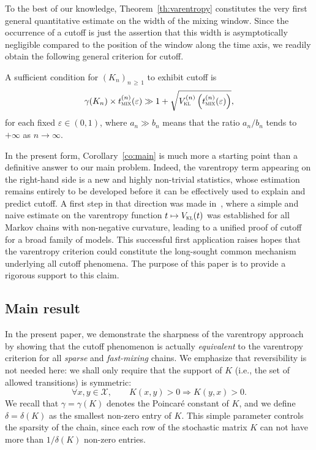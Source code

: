 \documentclass[10pt]{amsart}
\theoremstyle{definition}\newtheorem{defi}[theo]{Definition}\newtheorem{rema}[theo]{Remark}\newtheorem{exam}[theo]{Example}\newtheorem{exem}[theo]{Example}\newtheorem{nota}[theo]{Notation}
\newcommand{\cX}{\mathcal{X}}
\newcommand{\vkl}{V_{\textsc{kl}}}
\newcommand{\tmix}{t_{\textsc{mix}}}
\let\oldforall\forall
\renewcommand*{\forall}{\mathrel{\oldforall}}
\begin{document}
To the best of our knowledge, Theorem~\ref{th:varentropy} constitutes the very first general quantitative estimate on the width of the mixing window. Since the occurrence of a cutoff is just the assertion that this width is asymptotically negligible compared to the position of the window along the time axis, we readily obtain the following general criterion for cutoff.

\begin{coro}\label{co:main}
A sufficient condition for $(K_n)_{n\,\ge\,1}$ to exhibit cutoff is
\begin{equation}\label{VC}
\gamma(K_n)\times \tmix^{(n)}(\varepsilon) \gg 1+\sqrt{\vkl^{(n)}\left(\tmix^{(n)}(\varepsilon)\right)},
\end{equation}
for each fixed $\varepsilon\in (0,1)$, where $a_n\gg b_n$ means that the ratio $a_n/b_n$ tends to $+\infty$ as $n\to\infty$.
\end{coro}

In the present form, Corollary~\ref{co:main} is much more a starting point than a definitive answer to our main problem. Indeed, the varentropy term appearing on the right-hand side is a new and highly non-trivial statistics, whose estimation remains entirely to be developed before it can be effectively used to explain and predict cutoff. A first step in that direction was made in~\cite{arxiv.2102.05597}, where a simple and naive estimate on the varentropy function $t\mapsto \vkl(t)$ was established for all Markov chains with non-negative curvature, leading to a unified proof of cutoff for a broad family of models. This successful first application raises hopes that the varentropy criterion could constitute the long-sought common mechanism underlying all cutoff phenomena. The purpose of this paper is to provide a rigorous support to this claim.


\subsection{Main result}

In the present paper, we demonstrate the sharpness of the varentropy approach by showing that the cutoff phenomenon is actually \emph{equivalent} to the varentropy criterion for all \emph{sparse} and \emph{fast-mixing} chains. We emphasize that reversibility is not needed here: we shall only require that the support of $K$ (i.e., the set of allowed transitions) is symmetric:
\begin{equation}\label{support}
\forall x,y\in\cX,\qquad K(x,y)>0 \Longrightarrow K(y,x)>0.
\end{equation}
We recall that $\gamma=\gamma(K)$ denotes the Poincar\'e constant of $K$, and we define $\delta=\delta(K)$ as the smallest non-zero entry of $K$. This simple parameter controls the sparsity of the chain, since each row of the stochastic matrix $K$ can not have more than $1/\delta(K)$ non-zero entries.
\end{document}
